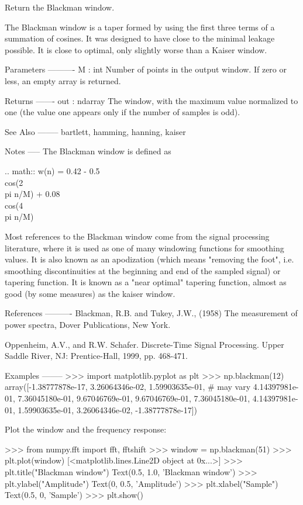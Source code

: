 \begin{DoxyVerb}Return the Blackman window.

The Blackman window is a taper formed by using the first three
terms of a summation of cosines. It was designed to have close to the
minimal leakage possible.  It is close to optimal, only slightly worse
than a Kaiser window.

Parameters
----------
M : int
    Number of points in the output window. If zero or less, an empty
    array is returned.

Returns
-------
out : ndarray
    The window, with the maximum value normalized to one (the value one
    appears only if the number of samples is odd).

See Also
--------
bartlett, hamming, hanning, kaiser

Notes
-----
The Blackman window is defined as

.. math::  w(n) = 0.42 - 0.5 \\cos(2\\pi n/M) + 0.08 \\cos(4\\pi n/M)

Most references to the Blackman window come from the signal processing
literature, where it is used as one of many windowing functions for
smoothing values.  It is also known as an apodization (which means
"removing the foot", i.e. smoothing discontinuities at the beginning
and end of the sampled signal) or tapering function. It is known as a
"near optimal" tapering function, almost as good (by some measures)
as the kaiser window.

References
----------
Blackman, R.B. and Tukey, J.W., (1958) The measurement of power spectra,
Dover Publications, New York.

Oppenheim, A.V., and R.W. Schafer. Discrete-Time Signal Processing.
Upper Saddle River, NJ: Prentice-Hall, 1999, pp. 468-471.

Examples
--------
>>> import matplotlib.pyplot as plt
>>> np.blackman(12)
array([-1.38777878e-17,   3.26064346e-02,   1.59903635e-01, # may vary
        4.14397981e-01,   7.36045180e-01,   9.67046769e-01,
        9.67046769e-01,   7.36045180e-01,   4.14397981e-01,
        1.59903635e-01,   3.26064346e-02,  -1.38777878e-17])

Plot the window and the frequency response:

>>> from numpy.fft import fft, fftshift
>>> window = np.blackman(51)
>>> plt.plot(window)
[<matplotlib.lines.Line2D object at 0x...>]
>>> plt.title("Blackman window")
Text(0.5, 1.0, 'Blackman window')
>>> plt.ylabel("Amplitude")
Text(0, 0.5, 'Amplitude')
>>> plt.xlabel("Sample")
Text(0.5, 0, 'Sample')
>>> plt.show()


\end{DoxyVerb}

